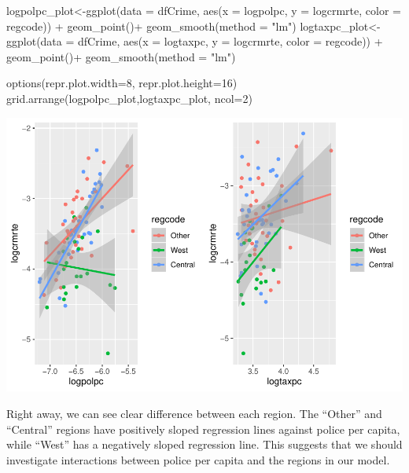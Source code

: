 \documentclass[]{article}
\newenvironment{Shaded}{}{}
\newcommand{\DataTypeTok}[1]{#1}
\newcommand{\DecValTok}[1]{#1}
\newcommand{\KeywordTok}[1]{\textcolor[rgb]{0.00,0.00,1.00}{#1}}
\newcommand{\NormalTok}[1]{#1}
\newcommand{\OperatorTok}[1]{#1}
\newcommand{\StringTok}[1]{\textcolor[rgb]{0.00,0.50,0.50}{#1}}
\begin{document}
\begin{Shaded}
\begin{Highlighting}[]
\NormalTok{logpolpc_plot<-}\KeywordTok{ggplot}\NormalTok{(}\DataTypeTok{data =}\NormalTok{ dfCrime, }\KeywordTok{aes}\NormalTok{(}\DataTypeTok{x =}\NormalTok{ logpolpc, }\DataTypeTok{y =}\NormalTok{ logcrmrte, }\DataTypeTok{color =}\NormalTok{ regcode)) }\OperatorTok{+}
\StringTok{      }\KeywordTok{geom_point}\NormalTok{()}\OperatorTok{+}
\StringTok{  }\KeywordTok{geom_smooth}\NormalTok{(}\DataTypeTok{method =} \StringTok{"lm"}\NormalTok{)}
\NormalTok{logtaxpc_plot<-}\KeywordTok{ggplot}\NormalTok{(}\DataTypeTok{data =}\NormalTok{ dfCrime, }\KeywordTok{aes}\NormalTok{(}\DataTypeTok{x =}\NormalTok{ logtaxpc, }\DataTypeTok{y =}\NormalTok{ logcrmrte, }\DataTypeTok{color =}\NormalTok{ regcode)) }\OperatorTok{+}
\StringTok{      }\KeywordTok{geom_point}\NormalTok{()}\OperatorTok{+}
\StringTok{  }\KeywordTok{geom_smooth}\NormalTok{(}\DataTypeTok{method =} \StringTok{"lm"}\NormalTok{)}

\KeywordTok{options}\NormalTok{(}\DataTypeTok{repr.plot.width=}\DecValTok{8}\NormalTok{, }\DataTypeTok{repr.plot.height=}\DecValTok{16}\NormalTok{)}
\KeywordTok{grid.arrange}\NormalTok{(logpolpc_plot,logtaxpc_plot, }\DataTypeTok{ncol=}\DecValTok{2}\NormalTok{)}
\end{Highlighting}
\end{Shaded}

\includegraphics{Bagnard_Gaustad_Hartman_Leung_Lab_3_files/figure-latex/unnamed-chunk-68-1.pdf}

Right away, we can see clear difference between each region. The
``Other'' and ``Central'' regions have positively sloped regression
lines against police per capita, while ``West'' has a negatively sloped
regression line. This suggests that we should investigate interactions
between police per capita and the regions in our model.
\end{document}
